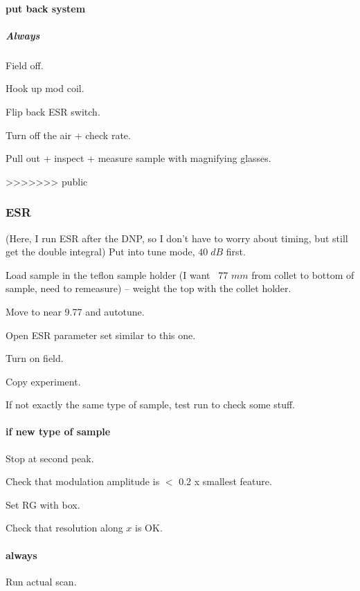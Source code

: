 \begin{scriptsize}
\begin{python}[off]
\begin{scriptsize}
\begin{python}[off]
\paragraph{put back system}
\subparagraph{Always}
Field off.

Hook up mod coil.

Flip back ESR switch.

Turn off the air + check rate.

Pull out + inspect + measure sample with magnifying glasses.

>>>>>>> public
\subsubsection{ESR}

(Here, I run ESR after the DNP, so I don't have to worry about timing, but still get the double integral)
Put into tune mode, $40\;dB$ first.

Load sample in the teflon sample holder (I want ~77 $mm$ from collet to bottom of sample, need to remeasure) -- weight the top with the collet holder.

Move to near 9.77 and autotune.

Open ESR parameter set similar to this one.

Turn on field.

Copy experiment.

If not exactly the same type of sample, test run to check some stuff.


\paragraph{if new type of sample}
Stop at second peak.

Check that modulation amplitude is $<$ 0.2 x smallest feature.

Set RG with box.

Check that resolution along $x$ is OK.

\paragraph{always}

Run actual scan.


\end{python}
\end{scriptsize}
\end{python}
\end{scriptsize}
